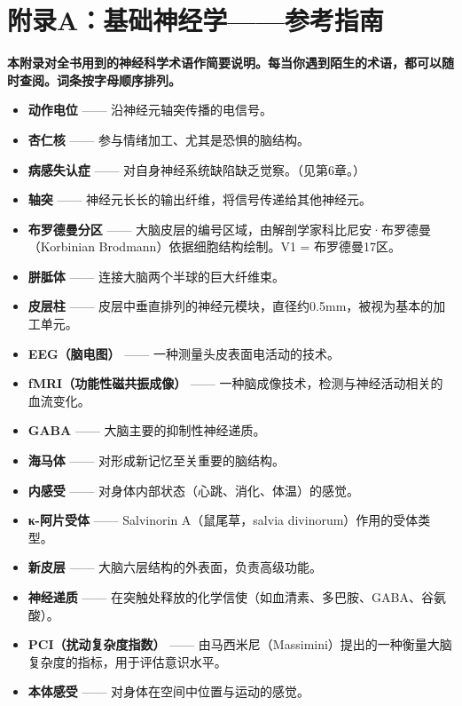 \documentclass[11pt, twoside, openright]{book}
\begin{document}
\chapter*{附录A：基础神经学------参考指南}

\textbf{本附录对全书用到的神经科学术语作简要说明。每当你遇到陌生的术语，都可以随时查阅。词条按字母顺序排列。}

\begin{itemize}
  \item \textbf{动作电位} ------ 沿神经元轴突传播的电信号。
  \item \textbf{杏仁核} ------ 参与情绪加工、尤其是恐惧的脑结构。
  \item \textbf{病感失认症} ------ 对自身神经系统缺陷缺乏觉察。（见第6章。）
  \item \textbf{轴突} ------ 神经元长长的输出纤维，将信号传递给其他神经元。
  \item \textbf{布罗德曼分区} ------ 大脑皮层的编号区域，由解剖学家科比尼安·布罗德曼（Korbinian Brodmann）依据细胞结构绘制。V1 = 布罗德曼17区。
  \item \textbf{胼胝体} ------ 连接大脑两个半球的巨大纤维束。
  \item \textbf{皮层柱} ------ 皮层中垂直排列的神经元模块，直径约0.5mm，被视为基本的加工单元。
  \item \textbf{EEG（脑电图）} ------ 一种测量头皮表面电活动的技术。
  \item \textbf{fMRI（功能性磁共振成像）} ------ 一种脑成像技术，检测与神经活动相关的血流变化。
  \item \textbf{GABA} ------ 大脑主要的抑制性神经递质。
  \item \textbf{海马体} ------ 对形成新记忆至关重要的脑结构。
  \item \textbf{内感受} ------ 对身体内部状态（心跳、消化、体温）的感觉。
  \item \textbf{κ-阿片受体} ------ Salvinorin A（鼠尾草，salvia divinorum）作用的受体类型。
  \item \textbf{新皮层} ------ 大脑六层结构的外表面，负责高级功能。
  \item \textbf{神经递质} ------ 在突触处释放的化学信使（如血清素、多巴胺、GABA、谷氨酸）。
  \item \textbf{PCI（扰动复杂度指数）} ------ 由马西米尼（Massimini）提出的一种衡量大脑复杂度的指标，用于评估意识水平。
  \item \textbf{本体感受} ------ 对身体在空间中位置与运动的感觉。

\end{itemize}
\end{document}
